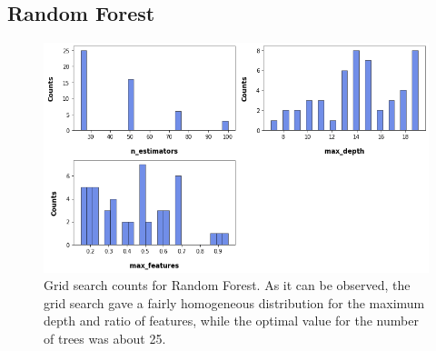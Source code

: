 \subsection*{Random Forest}

\begin{figure}[h!]
    \centering
    \includegraphics[width=\textwidth]{Images/Appendix/Counts.png}
    \caption{Grid search counts for Random Forest. As it can be observed, the grid search gave a fairly homogeneous distribution for the maximum depth and ratio of features, while the optimal value for the number of trees was about 25.}
\end{figure}
